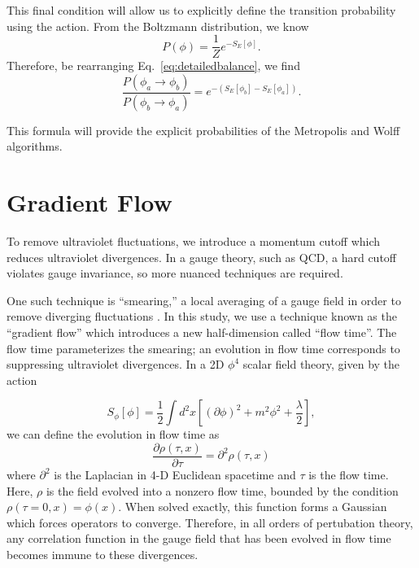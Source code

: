 \documentclass[12pt]{report}
\begin{document}
This final condition will allow us to explicitly define the transition probability using the action. From the Boltzmann distribution, we know
\begin{equation}
    P(\phi) = \frac{1}{Z} e^{-S_E[\phi]}.
\end{equation}
Therefore, be rearranging Eq.~\ref{eq:detailedbalance}, we find
\begin{equation}
    \frac{P(\phi_a\rightarrow\phi_b)}{P(\phi_b\rightarrow\phi_a)} = e^{-(S_E[\phi_b] - S_E[\phi_a])}.
\end{equation}

This formula will provide the explicit probabilities of the Metropolis and Wolff algorithms.


\section{Gradient Flow}
To remove ultraviolet fluctuations, we introduce a momentum cutoff which reduces ultraviolet divergences. In a gauge theory, such as QCD, a hard cutoff violates gauge invariance, so more nuanced techniques are required.

One such technique is ``smearing,'' a local averaging of a gauge field in order to remove diverging fluctuations \cite{solbrig2007}. In this study, we use a technique known as the ``gradient flow'' \cite{monahan2015} which introduces a new half-dimension called ``flow time''. The flow time parameterizes the smearing; an evolution in flow time corresponds to suppressing ultraviolet divergences. In a 2D $\phi^4$ scalar field theory, given by the action

\begin{equation}
    S_\phi [\phi] = \frac{1}{2}\int d^2x\left[(\partial \phi)^2+m^2\phi^2+\frac{\lambda}{2}\right],
\end{equation}
we can define the evolution in flow time as
\begin{equation}
    \frac{\partial \rho(\tau, x)}{\partial \tau} = \partial^2 \rho(\tau,x)
\end{equation}
where $\partial^2$ is the Laplacian in 4-D Euclidean spacetime and $\tau$ is the flow time. Here, $\rho$ is the field evolved into a nonzero flow time, bounded by the condition $\rho(\tau=0,x) = \phi(x)$. When solved exactly, this function forms a Gaussian which forces operators to converge. Therefore, in all orders of pertubation theory, any correlation function in the gauge field that has been evolved in flow time becomes immune to these divergences\cite{makino2015a}.
\end{document}
